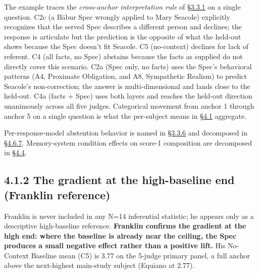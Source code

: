 The example traces the \emph{cross-anchor interpretation rule} of \hyperref[score-interpretation]{§3.3.1}
on a single question. C2c (a Bābur Spec wrongly applied to Mary Seacole)
explicitly recognizes that the served Spec describes a different person
and declines; the response is articulate but the prediction is the
opposite of what the held-out shows because the Spec doesn't fit
Seacole. C5 (no-context) declines for lack of referent. C4 (all facts,
no Spec) abstains because the facts as supplied do not directly cover
this scenario. C2a (Spec only, no facts) uses the Spec's behavioral
patterns (A4, Proximate Obligation, and A8, Sympathetic Realism) to
predict Seacole's non-correction; the answer is multi-dimensional and
lands close to the held-out. C4a (facts + Spec) uses both layers and
reaches the held-out direction unanimously across all five judges.
Categorical movement from anchor 1 through anchor 5 on a single question
is what the per-subject means in \hyperref[the-cross-subject-gradient-and-its-per-question-mechanism]{§4.1} aggregate.

Per-response-model abstention behavior is named in \hyperref[rubric-handling-limitations-post-hoc-validity-audit]{§3.3.6} and decomposed
in \hyperref[rubric-handling-limitations-post-hoc-validity-audit-1]{§4.6.7}. Memory-system condition effects on score-1 composition are
decomposed in \hyperref[memory-system-composition]{§4.4}.

\hypertarget{the-gradient-at-the-high-baseline-end-franklin-reference}{%
\subsection{4.1.2 The gradient at the high-baseline end (Franklin
reference)}\label{the-gradient-at-the-high-baseline-end-franklin-reference}}

Franklin is never included in any N=14 inferential statistic; he appears
only as a descriptive high-baseline reference. \textbf{Franklin confirms
the gradient at the high end: where the baseline is already near the
ceiling, the Spec produces a small negative effect rather than a
positive lift.} His No-Context Baseline mean (C5) is 3.77 on the 5-judge
primary panel, a full anchor above the next-highest main-study subject
(Equiano at 2.77).

